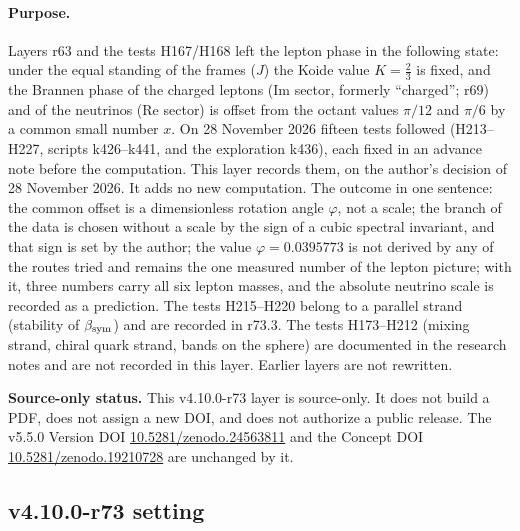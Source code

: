 \paragraph{Purpose.}
Layers r63 and the tests H167/H168 left the lepton phase in the following state: under the equal standing of the frames (\(J\)) the Koide
value \(K=\tfrac23\) is fixed, and the Brannen phase of the charged leptons (Im sector, formerly ``charged''; r69) and of the neutrinos
(Re sector) is offset from the octant values \(\pi/12\) and \(\pi/6\) by a common small number \(x\).  On 28 November 2026 fifteen tests
followed (H213--H227, scripts k426--k441, and the exploration k436), each fixed in an advance note before the computation.  This layer
records them, on the author's decision of 28 November 2026.  It adds no new computation.  The outcome in one sentence: the common offset
is a dimensionless rotation angle \(\varphi\), not a scale; the branch of the data is chosen without a scale by the sign of a cubic spectral
invariant, and that sign is set by the author; the value \(\varphi=0.0395773\) is not derived by any of the routes tried and remains the one
measured number of the lepton picture; with it, three numbers carry all six lepton masses, and the absolute neutrino scale is recorded as a
prediction.  The tests H215--H220 belong to a parallel strand (stability of \(\beta_{\rm sym}\)) and are recorded in r73.3.  The tests
H173--H212 (mixing strand, chiral quark strand, bands on the sphere) are documented in the research notes and are not recorded in this
layer.  Earlier layers are not rewritten.

\noindent\textbf{Source-only status.}
This v4.10.0-r73 layer is source-only.  It does not build a PDF, does not assign a new DOI,
and does not authorize a public release.  The v5.5.0 Version DOI
\href{https://doi.org/10.5281/zenodo.24563811}{10.5281/zenodo.24563811} and the Concept DOI
\href{https://doi.org/10.5281/zenodo.19210728}{10.5281/zenodo.19210728} are unchanged by it.

\subsection*{v4.10.0-r73 setting}
\label{subsec:v4100-r73-setting}

